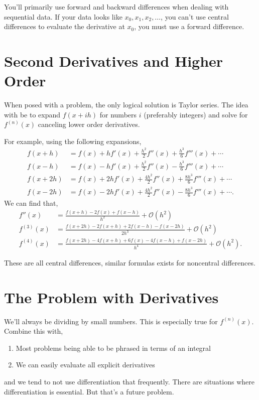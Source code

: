 \documentclass[11pt,letterpaper]{article}
\newcommand{\bigO}{\mathcal{O}}
\begin{document}
You'll primarily use forward and backward differences when dealing with sequential data. If your
data looks like $x_0,x_1,x_2,\dots$, you can't use central differences to evaluate the derivative
at $x_0$, you must use a forward difference.

\section{Second Derivatives and Higher Order}
When posed with a problem, the only logical solution is Taylor series. The idea with be to 
expand $f(x+ih)$ for numbers $i$ (preferably integers) and solve for $f^{(n)}(x)$ canceling
lower order derivatives. 

For example, using the following expansions,
\begin{align*}
  f(x+h) &= f(x) + hf'(x) + \frac{h^2}{2}f''(x) + \frac{h^3}{6}f'''(x)+\cdots \\
 f(x-h) &= f(x) - hf'(x) + \frac{h^2}{2}f''(x) - \frac{h^3}{6}f'''(x)+\cdots \\
 f(x+2h) &= f(x) + 2hf'(x) + \frac{4h^2}{2}f''(x) + \frac{8h^3}{6}f'''(x)+\cdots \\
 f(x-2h) &= f(x) - 2hf'(x) + \frac{4h^2}{2}f''(x) - \frac{8h^3}{6}f'''(x)+\cdots.
\end{align*}
We can find that,
\begin{align*}
 f''(x) &= \frac{f(x+h)-2f(x)+f(x-h)}{h^2} + \bigO(h^2) \\
 f^{(3)}(x) &= \frac{f(x+2h)-2f(x+h)+2f(x-h)-f(x-2h)}{2h^3} + \bigO(h^2) \\
 f^{(4)}(x) &= \frac{f(x+2h)-4f(x+h)+6f(x)-4f(x-h)+f(x-2h)}{h^4} + \bigO(h^2).
\end{align*}

These are all central differences, similar formulas exists for noncentral differences.


\section{The Problem with Derivatives}
We'll always be dividing by small numbers. This is especially true for $f^{(n)}(x)$. Combine this
with,
\begin{enumerate}
 \item Most problems being able to be phrased in terms of an integral
 \item We can easily evaluate all explicit derivatives
\end{enumerate}
and we tend to not use differentiation that frequently. There are situations where differentiation
is essential. But that's a future problem.
\end{document}
